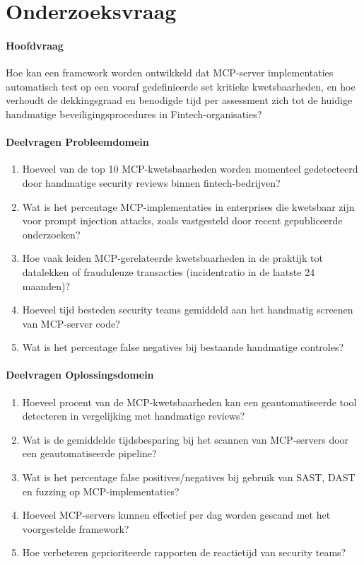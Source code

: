 \section{Onderzoeksvraag}
\label{voorstel:sec:onderzoeksvraag}

\paragraph{Hoofdvraag}
Hoe kan een framework worden ontwikkeld dat MCP-server implementaties automatisch test op een vooraf gedefinieerde set kritieke kwetsbaarheden, en hoe verhoudt de dekkingsgraad en benodigde tijd per assessment zich tot de huidige handmatige beveiligingsprocedures in Fintech-organisaties?

\paragraph{Deelvragen Probleemdomein}
\begin{enumerate}
    \item Hoeveel van de top 10 MCP-kwetsbaarheden worden momenteel gedetecteerd door handmatige security reviews binnen fintech-bedrijven?
    \item Wat is het percentage MCP-implementaties in enterprises die kwetsbaar zijn voor prompt injection attacks, zoals vastgesteld door recent gepubliceerde onderzoeken?
    \item Hoe vaak leiden MCP-gerelateerde kwetsbaarheden in de praktijk tot datalekken of frauduleuze transacties (incidentratio in de laatste 24 maanden)?
    \item Hoeveel tijd besteden security teams gemiddeld aan het handmatig screenen van MCP-server code?
    \item Wat is het percentage false negatives bij bestaande handmatige controles?
\end{enumerate}

\paragraph{Deelvragen Oplossingsdomein}
\begin{enumerate}
    \item Hoeveel procent van de MCP-kwetsbaarheden kan een geautomatiseerde tool detecteren in vergelijking met handmatige reviews?
    \item Wat is de gemiddelde tijdsbesparing bij het scannen van MCP-servers door een geautomatiseerde pipeline?
    \item Wat is het percentage false positives/negatives bij gebruik van SAST, DAST en fuzzing op MCP-implementaties?
    \item Hoeveel MCP-servers kunnen effectief per dag worden gescand met het voorgestelde framework?
    \item Hoe verbeteren geprioriteerde rapporten de reactietijd van security teams?
\end{enumerate}


